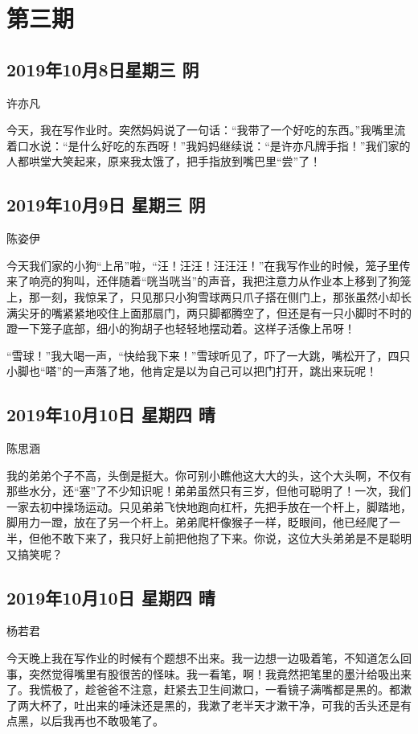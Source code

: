 \chapter{第三期}

\section{2019年10月8日星期三 阴}

许亦凡

今天，我在写作业时。突然妈妈说了一句话：“我带了一个好吃的东西。”我嘴里流着口水说：“是什么好吃的东西呀！”我妈妈继续说：“是许亦凡牌手指！”我们家的人都哄堂大笑起来，原来我太饿了，把手指放到嘴巴里“尝”了！

\section{2019年10月9日 星期三 阴}

陈姿伊

今天我们家的小狗“上吊”啦，“汪！汪汪！汪汪汪！”在我写作业的时候，笼子里传来了响亮的狗叫，还伴随着“咣当咣当”的声音，我把注意力从作业本上移到了狗笼上，那一刻，我惊呆了，只见那只小狗雪球两只爪子搭在侧门上，那张虽然小却长满尖牙的嘴紧紧地咬住上面那扇门，两只脚都腾空了，但还是有一只小脚时不时的蹬一下笼子底部，细小的狗胡子也轻轻地摆动着。这样子活像上吊呀！

“雪球！”我大喝一声，“快给我下来！”雪球听见了，吓了一大跳，嘴松开了，四只小脚也“嗒”的一声落了地，他肯定是以为自己可以把门打开，跳出来玩呢！

\section{2019年10月10日 星期四 晴}

陈思涵

我的弟弟个子不高，头倒是挺大。你可别小瞧他这大大的头，这个大头啊，不仅有那些水分，还“塞”了不少知识呢！弟弟虽然只有三岁，但他可聪明了！一次，我们一家去初中操场运动。只见弟弟飞快地跑向杠杆，先把手放在一个杆上，脚踏地，脚用力一蹬，放在了另一个杆上。弟弟爬杆像猴子一样，眨眼间，他已经爬了一半，但他不敢下来了，我只好上前把他抱了下来。你说，这位大头弟弟是不是聪明又搞笑呢？

\section{2019年10月10日 星期四 晴}

杨若君

今天晚上我在写作业的时候有个题想不出来。我一边想一边吸着笔，不知道怎么回事，突然觉得嘴里有股很苦的怪味。我一看笔，啊！我竟然把笔里的墨汁给吸出来了。我慌极了，趁爸爸不注意，赶紧去卫生间漱口，一看镜子满嘴都是黑的。都漱了两大杯了，吐出来的唾沫还是黑的，我漱了老半天才漱干净，可我的舌头还是有点黑，以后我再也不敢吸笔了。


